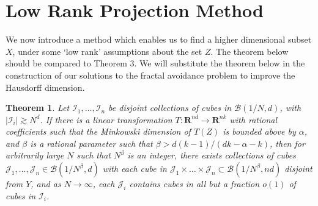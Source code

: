 \documentclass{article}
\theoremstyle{plain}
\theoremstyle{plain}
\newtheorem{theorem}{Theorem}
\begin{document}
\section{Low Rank Projection Method}

We now introduce a method which enables us to find a higher dimensional subset $X$, under some `low rank' assumptions about the set $Z$. The theorem below should be compared to Theorem 3. We will substitute the theorem below in the construction of our solutions to the fractal avoidance problem to improve the Hausdorff dimension.

\begin{theorem}
	Let $\mathcal{I}_1, \dots, \mathcal{I}_n$ be disjoint collections of cubes in $\mathcal{B}(1/N,d)$, with $|\mathcal{I}_i| \gtrsim N^d$. If there is a linear transformation $T: \mathbf{R}^{nd} \to \mathbf{R}^{nk}$ with rational coefficients such that the Minkowski dimension of $T(Z)$ is bounded above by $\alpha$, and $\beta$ is a rational parameter such that $\beta > d(k-1)/(dk - \alpha - k)$, then for arbitrarily large $N$ such that $N^\beta$ is an integer, there exists collections of cubes $\mathcal{J}_1, \dots, \mathcal{J}_n \in \mathcal{B}(1/N^\beta,d)$ with each cube in $\mathcal{J}_1 \times \dots \times \mathcal{J}_n \subset \mathcal{B}(1/N^\beta,nd)$ disjoint from $Y$, and as $N \to \infty$, each $\mathcal{J}_i$ contains cubes in all but a fraction $o(1)$ of cubes in $\mathcal{I}_i$.
\end{theorem}
\end{document}
